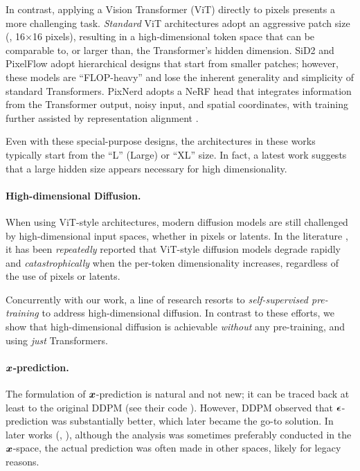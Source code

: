 In contrast, applying a Vision Transformer (ViT) \cite{Dosovitskiy2021} directly to pixels presents a more challenging task. \mbox{\textit{Standard}} ViT architectures adopt an aggressive patch size (\eg, 16$\times$16 pixels), resulting in a high-dimensional token space that can be comparable to, or larger than, the Transformer's hidden dimension. 
SiD2 \cite{hoogeboom2024simpler} and PixelFlow \cite{chen2025pixelflow} adopt hierarchical designs that start from smaller patches; however, these models are ``FLOP-heavy'' \cite{hoogeboom2024simpler} and lose the inherent generality and simplicity of standard Transformers. \mbox{PixNerd} \cite{wang2025pixnerd} adopts a NeRF head \cite{mildenhall2021nerf} that integrates information from the Transformer output, noisy input, and spatial coordinates, with training further assisted by representation alignment \cite{repa}.

Even with these special-purpose designs, the architectures in these works typically start from the ``L'' (Large) or ``XL'' size.
In fact, a latest work \cite{yao2025reconstruction} suggests that a large hidden size appears necessary for high dimensionality.

\paragraph{High-dimensional Diffusion.} 
When using ViT-style architectures, modern diffusion models are still challenged by high-dimensional input spaces, whether in pixels or latents.
In the literature \cite{chen2024deconstructing,yao2025reconstruction,shi2025latent}, it has been \textit{repeatedly} reported that ViT-style diffusion models degrade rapidly and \textit{catastrophically} when the per-token dimensionality increases, regardless of the use of pixels or latents.

Concurrently with our work, a line of research 
\cite{zheng2025diffusion,lei2025advancing,shi2025latent} resorts to \textit{self-supervised pre-training} to address high-dimensional diffusion.
In contrast to these efforts, we show that high-dimensional diffusion is achievable \textit{without} any pre-training, and using \textit{just} Transformers.

\paragraph{$\bm{x}$-prediction.} 
The formulation of $\bm{x}$-prediction is natural and not new; it can be traced back at least to the original DDPM \cite{Ho2020} (see their code \cite{ho2020diffusion_code}). However, DDPM observed that $\bm{\epsilon}$-prediction was substantially better, which later became the go-to solution.
In later works (\eg, \cite{hoogeboom2024simpler}), although the analysis was sometimes preferably conducted in the $\bm{x}$-space, the actual prediction was often made in other spaces, likely for legacy reasons.

